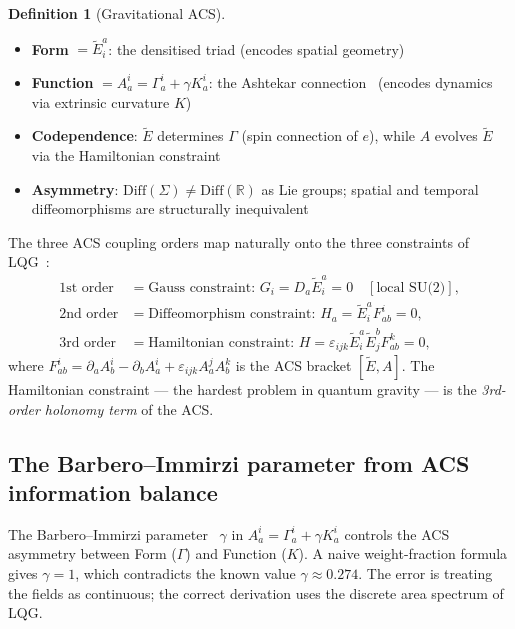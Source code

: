 \documentclass[12pt,a4paper]{article}
\theoremstyle{plain}
\theoremstyle{definition}
\newtheorem{definition}[theorem]{Definition}
\theoremstyle{remark}
\begin{document}
\begin{definition}[Gravitational ACS]
\begin{itemize}[noitemsep]
  \item \textbf{Form} $= \tilde{E}^a_i$: the densitised triad (encodes spatial geometry)
  \item \textbf{Function} $= A^i_a = \Gamma^i_a + \gamma K^i_a$: the Ashtekar connection~\cite{Ashtekar1986}
    (encodes dynamics via extrinsic curvature $K$)
  \item \textbf{Codependence}: $\tilde{E}$ determines $\Gamma$ (spin connection of $e$),
    while $A$ evolves $\tilde{E}$ via the Hamiltonian constraint
  \item \textbf{Asymmetry}: $\mathrm{Diff}(\Sigma) \neq \mathrm{Diff}(\mathbb{R})$ as Lie groups;
    spatial and temporal diffeomorphisms are structurally inequivalent
\end{itemize}
\end{definition}

The three ACS coupling orders map naturally onto the three constraints of LQG~\cite{Rovelli2004,Thiemann2007}:
\begin{align}
  \text{1st order} &= \text{Gauss constraint: } G_i = D_a \tilde{E}^a_i = 0 \quad [\text{local SU(2)}], \\
  \text{2nd order} &= \text{Diffeomorphism constraint: } H_a = \tilde{E}^a_i F^i_{ab} = 0, \\
  \text{3rd order} &= \text{Hamiltonian constraint: } H = \varepsilon_{ijk}\tilde{E}^a_i\tilde{E}^b_j F^k_{ab} = 0,
\end{align}
where $F^i_{ab} = \partial_a A^i_b - \partial_b A^i_a + \varepsilon_{ijk}A^j_aA^k_b$
is the ACS bracket $[\tilde{E}, A]$.  The Hamiltonian constraint --- the hardest problem
in quantum gravity --- is the \emph{3rd-order holonomy term} of the ACS.

\subsection{The Barbero--Immirzi parameter from ACS information balance}

The Barbero--Immirzi parameter~\cite{Barbero1995,Immirzi1997} $\gamma$ in $A^i_a = \Gamma^i_a + \gamma K^i_a$
controls the ACS asymmetry between Form ($\Gamma$) and Function ($K$).
A naive weight-fraction formula gives $\gamma = 1$, which contradicts the
known value $\gamma \approx 0.274$.  The error is treating the fields as
continuous; the correct derivation uses the discrete area spectrum of LQG.
\end{document}
